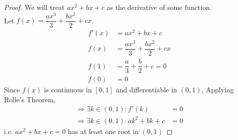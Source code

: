 \documentclass[14]{article}
\theoremstyle{definition}
\theoremstyle{case}
\begin{document}
\begin{proof}
We will treat $ax^2 + bx + c$ as the derivative of some function.\\
Let $f(x) = \dfrac{ax^3}{3} + \dfrac{bx^2}{2} + cx$.
\begin{align*}
f'(x) &= ax^2 + bx + c\\
f(x) &= \dfrac{ax^3}{3} + \dfrac{bx^2}{2} + cx\\
f(1) &= \dfrac{a}3 + \dfrac{b}2 + c = 0\\
f(0) &= 0
\end{align*}
Since $f(x)$ is continuous in $[0, 1]$ and differentiable in $(0, 1)$, Applying Rolle's Theorem,\\
\begin{align*}
\Rightarrow \exists k \in (0, 1) : f'(k) &= 0\\
\Rightarrow \exists k \in (0, 1) : ak^2 + bk + c &= 0
\end{align*}
i.e. $ax^2 + bx + c = 0$ has at least one root in $(0, 1)$
\end{proof}
\pagebreak
\end{document}
